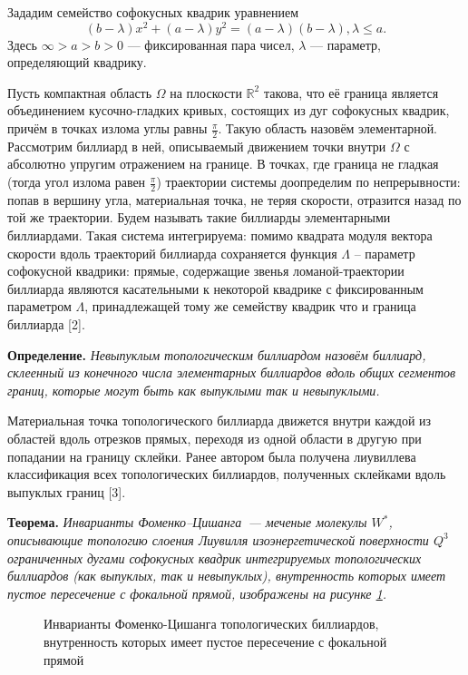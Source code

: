 



Зададим семейство софокусных квадрик уравнением
$$(b-\lambda)x^2+(a-\lambda)y^2=(a-\lambda)(b-\lambda),   \lambda\leqslant a.    $$
Здесь $\infty> a> b>0$ --- фиксированная   пара чисел, $\lambda$ ---
параметр, определяющий квадрику.

Пусть  компактная область $\Omega$  на плоскости $\mathbb{R}^2$  такова,
что её граница  является объединением кусочно-гладких \!\!\;кривых,
состоящих из дуг софокусных квадрик, причём в точках излома  углы равны $\frac{\pi}{2}$. Такую область назовём элементарной.
Рассмотрим   биллиард  в ней, описываемый движением   точки внутри  $\Omega$ с
абсолютно упругим отражением на границе. В точках,
где граница   не гладкая
(тогда   угол излома  равен $\frac{\pi}{2}$)
 траектории системы  доопределим по непрерывности:  попав в вершину угла, материальная точка, не теряя скорости, отразится назад по той же траектории.  Будем называть такие биллиарды элементарными биллиардами.
 Такая система   интегрируема: помимо квадрата модуля вектора скорости   вдоль траекторий биллиарда сохраняется функция $\Lambda$ -- параметр софокусной квадрики: прямые, содержащие звенья ломаной-траектории биллиарда являются касательными к некоторой квадрике с фиксированным параметром $\Lambda$, принадлежащей тому же семейству квадрик что и граница биллиарда [2].

\textbf{Определение.}
{\it Невыпуклым  топологическим   биллиардом   назовём биллиард,  склеенный из конечного числа элементарных биллиардов вдоль общих   сегментов границ, которые могут быть как выпуклыми так и невыпуклыми.}

Материальная точка  топологического биллиарда дви\-же\-т\-ся внутри каждой из областей вдоль отрезков прямых,
переходя из одной области в другую при попадании на границу склейки.
Ранее автором была получена ли\-у\-вил\-ле\-ва классификация всех  топологических биллиардов,
полученных склейками вдоль выпуклых границ [3].

\textbf{Теорема.}
{\it Инварианты Фоменко--Цишанга~--- меченые молекулы $W^*$,
описывающие топологию слоения Лиувилля изоэнергетической поверхности $Q^3$
ограниченных дугами софокусных квадрик интегрируемых топологических биллиардов (как выпуклых, так и невыпуклых),
внутренность которых имеет пустое пересечение с фокальной прямой,   изображены на рисунке \ref{moleculesSimple}.
}
 \begin{figure}[h!]

\caption{Инварианты Фоменко-Цишанга топологических    биллиардов, внутренность которых имеет пустое пересечение с фокальной прямой}
\label{moleculesSimple}
 \end{figure}


